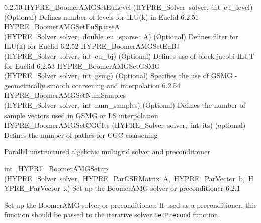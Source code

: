 \documentclass{article}
\begin{document}
\begin{cxxentry}
\begin{cxxentry}
\begin{cxxnames}
        {6.2.50}
        {HYPRE\_BoomerAMGSetEuLevel}
        {(HYPRE\_Solver\ solver,\ int\ eu\_level)}
        {
(Optional) Defines number of levels for ILU(k) in Euclid}
        {6.2.51}
        {HYPRE\_BoomerAMGSetEuSparseA}
        {(HYPRE\_Solver\ solver,\ double\ eu\_sparse\_A)}
        {
(Optional) Defines filter for ILU(k) for Euclid}
        {6.2.52}
        {HYPRE\_BoomerAMGSetEuBJ}
        {(HYPRE\_Solver\ solver,\ int\ eu\_bj)}
        {
(Optional) Defines use of block jacobi ILUT for Euclid}
        {6.2.53}
        {HYPRE\_BoomerAMGSetGSMG}
        {(HYPRE\_Solver\ solver,\ int\ gsmg)}
        {
(Optional) Specifies the use of GSMG - geometrically smooth 
coarsening and interpolation}
        {6.2.54}
        {HYPRE\_BoomerAMGSetNumSamples}
        {(HYPRE\_Solver\ solver,\ int\ num\_samples)}
        {
(Optional) Defines the number of sample vectors used in GSMG
or LS interpolation}
        {}
\label{cxx.6.2.65}
        {HYPRE\_BoomerAMGSetCGCIts}
        {(HYPRE\_Solver\ solver,\ int\ its)}
        {
(optional) Defines the number of pathes for CGC-coarsening}
        {}
\label{cxx.6.2.66}
\end{cxxnames}
\begin{cxxdoc}


Parallel unstructured algebraic multigrid solver and preconditioner
\end{cxxdoc}
\begin{cxxfunction}
{int\ }
        {HYPRE\_BoomerAMGSetup}
        {(HYPRE\_Solver\ solver,\ HYPRE\_ParCSRMatrix\ A,\ HYPRE\_ParVector\ b,\ HYPRE\_ParVector\ x)}
        {
Set up the BoomerAMG solver or preconditioner}
        {6.2.1}
\begin{cxxdoc}

Set up the BoomerAMG solver or preconditioner.  
If used as a preconditioner, this function should be passed
to the iterative solver {\tt SetPrecond} function.



\end{cxxdoc}
\end{cxxfunction}
\end{cxxentry}
\end{cxxentry}
\end{document}
